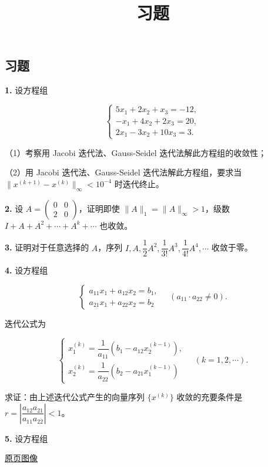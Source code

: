 \documentclass[
  10pt,
  fontset=fandol]{ctexart}
\title{习题}
\author{}
\date{}
\begin{document}
\maketitle

\subsection{习题}\label{ux4e60ux9898}

\textbf{1.} 设方程组

\[
\begin{cases}
5x_1+2x_2+x_3=-12,\\
-x_1+4x_2+2x_3=20,\\
2x_1-3x_2+10x_3=3.
\end{cases}
\]

（1）考察用 Jacobi 迭代法、Gauss-Seidel 迭代法解此方程组的收敛性；

（2）用 Jacobi 迭代法、Gauss-Seidel 迭代法解此方程组，要求当 \(\|x^{(k+1)}-x^{(k)}\|_\infty<10^{-4}\) 时迭代终止。

\textbf{2.} 设 \(A=\begin{pmatrix}0&0\\2&0\end{pmatrix}\)，证明即使 \(\|A\|_1=\|A\|_\infty>1\)，级数 \(I+A+A^2+\cdots+A^k+\cdots\) 也收敛。

\textbf{3.} 证明对于任意选择的 \(A\)，序列 \(I,\allowbreak A,\allowbreak \dfrac12A^2,\allowbreak \dfrac1{3!}A^3,\allowbreak \dfrac1{4!}A^4,\allowbreak \cdots\) 收敛于零。

\textbf{4.} 设方程组

\[
\begin{cases}
a_{11}x_1+a_{12}x_2=b_1,\\
a_{21}x_1+a_{22}x_2=b_2
\end{cases}
\quad(a_{11}\cdot a_{22}\neq0).
\]

迭代公式为

\[
\begin{cases}
x_1^{(k)}=\dfrac1{a_{11}}(b_1-a_{12}x_2^{(k-1)}),\\[5pt]
x_2^{(k)}=\dfrac1{a_{22}}(b_2-a_{21}x_1^{(k-1)})
\end{cases}
\quad(k=1,2,\cdots).
\]

求证：由上述迭代公式产生的向量序列 \(\{x^{(k)}\}\) 收敛的充要条件是 \(r=\left|\dfrac{a_{12}a_{21}}{a_{11}a_{22}}\right|<1\)。

\textbf{5.} 设方程组

\href{../../source-images/pdf-231.jpeg}{原页图像}
\end{document}
